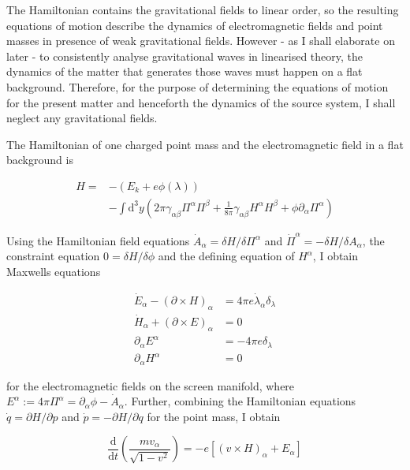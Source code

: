 \documentclass[11pt]{article}
\begin{document}
The Hamiltonian contains the gravitational fields to linear order, so the resulting equations of motion describe the dynamics of electromagnetic fields and point masses in presence of weak gravitational fields. However - as I shall elaborate on later - to consistently analyse gravitational waves in linearised theory, the dynamics of the matter that generates those waves must happen on a flat background. Therefore, for the purpose of determining the equations of motion for the present matter and henceforth the dynamics of the source system, I shall neglect any gravitational fields. 

The Hamiltonian of one charged point mass and the electromagnetic field in a flat background is

\begin{equation}
\begin{split}
		H = &- \left(E_k + e \phi \left( \lambda \right) \right)\\
		&- \int \mathrm{d}^3 y \left( 2 \pi \gamma_{\alpha \beta} \Pi^\alpha \Pi^\beta + \frac{1}{8 \pi}\gamma_{\alpha \beta} H^\alpha H^\beta
		+ \phi \partial_\alpha \Pi^\alpha \right)
\end{split}
\end{equation}

Using the Hamiltonian field equations $\dot{A}_\alpha = \delta H / \delta \Pi^\alpha$ and $\dot{\Pi}^\alpha = -\delta H / \delta A_\alpha$,  the constraint equation $0 = \delta H / \delta \phi$ and the defining equation of $H^\alpha$,  I obtain Maxwells equations

\begin{align}
	\dot{E}_\alpha - \left(\partial \times H \right)_\alpha &= 4 \pi e 
	\dot{\lambda}_\alpha \delta_\lambda\\
		\dot{H}_\alpha +  \left( \partial \times E \right)_\alpha &= 0\\
	\partial_\alpha E^\alpha &= - 4 \pi e \delta_\lambda\\ 
	\partial_\alpha H^\alpha &= 0
\end{align}

for the electromagnetic fields on the screen manifold, where $E^\alpha := 4 \pi \Pi^\alpha = \partial_\alpha \phi - \dot{A}_\alpha $. Further, combining the Hamiltonian equations $\dot{q} = \partial H / \partial p$ and $\dot{p} = - \partial H / \partial q$ for the point mass, I obtain 

\begin{equation}
	\frac{\mathrm{d}}{\mathrm{d}t} 
	\left( \frac{m v_\alpha}{\sqrt{1 - v^2 }}\right)
	= -e \left[ \left(v \times H \right)_\alpha + E_\alpha \right] 
\end{equation} 
\end{document}
